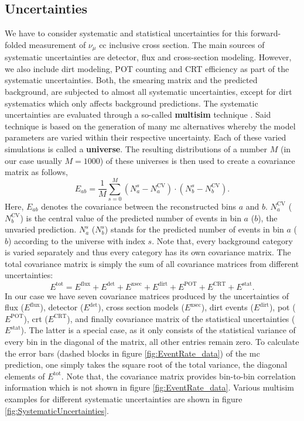\subsection{Uncertainties} \label{sec:NewUncertainties}
We have to consider systematic and statistical uncertainties for this forward-folded measurement of $\nu_\mu$ \gls{cc} inclusive cross section. The main sources of systematic uncertainties are detector, flux and cross-section modeling. However, we also include dirt modeling, POT counting and CRT efficiency as part of the systematic uncertainties. Both, the smearing matrix and the predicted background, are subjected to almost all systematic uncertainties, except for dirt systematics which only affects background predictions. The systematic uncertainties are evaluated through a so-called \textbf{multisim} technique \cite{SystErrorsUniverses}. Said technique is based on the generation of many \gls{mc} alternatives whereby the model parameters are varied within their respective uncertainty. Each of these varied simulations is called a \textbf{universe}. The resulting distributions of a number $M$ (in our case usually $M = 1000$) of these universes is then used to create a covariance matrix as follows,
\begin{equation}\label{eq:cov_multisim}
E_{ab} = \dfrac{1}{M} \sum^{M}_{s=0} (N^s_a - N^\text{CV}_a) \cdot (N^s_b - N^\text{CV}_b).
\end{equation}
Here, $E_{ab}$ denotes the covariance between the reconstructed bins $a$ and $b$. $N^\text{CV}_a$ ($N^\text{CV}_b$) is the central value of the predicted number of events in bin $a$ ($b$), \ie the unvaried prediction. $N^s_a$ ($N^s_b$) stands for the predicted number of events in bin $a$ ($b$) according to the universe with index $s$. Note that, every background category is varied separately and thus every category has its own covariance matrix. The total covariance matrix is simply the sum of all covariance matrices from different uncertainties:
\begin{equation} \label{eq:sum_cov}
E^\text{tot} = E^\text{flux} + E^\text{det} + E^\text{xsec} + E^\text{dirt} + E^\text{POT} + E^\text{CRT} + E^\text{stat}.
\end{equation}
In our case we have seven covariance matrices produced by the uncertainties of flux ($E^\text{flux}$), detector ($E^\text{det}$), cross section models ($E^\text{xsec}$), dirt events ($E^\text{dirt}$), \gls{pot} ($E^\text{POT}$), \gls{crt} ($E^\text{CRT}$), and finally covariance matrix of the statistical uncertainties ($E^\text{stat}$). The latter is a special case, as it only consists of the statistical variance of every bin in the diagonal of the matrix, all other entries remain zero. To calculate the error bars (dashed blocks in figure \ref{fig:EventRate_data}) of the \gls{mc} prediction, one simply takes the square root of the total variance, \ie the diagonal elements of $E^\text{tot}$. Note that, the covariance matrix provides bin-to-bin correlation information which is not shown in figure \ref{fig:EventRate_data}. Various multisim examples for different systematic uncertainties are shown in figure \ref{fig:SystematicUncertainties}.
